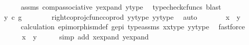 \begin{isabellebody}
\ \ \ \ \ \ \isamarkupfalse%
\ assms\ comp{\isacharunderscore}{\kern0pt}associative{}\ y{\isacharunderscore}{\kern0pt}expand\ y{\isacharunderscore}{\kern0pt}type\ \isamarkupfalse%
\ {\isacharparenleft}{\kern0pt}typecheck{\isacharunderscore}{\kern0pt}cfuncs{\isacharcomma}{\kern0pt}\ blast{\isacharparenright}{\kern0pt}\isanewline
\ \ \ \ \isamarkupfalse%
\ \isamarkupfalse%
\ {\isachardoublequoteopen}{\isachardot}{\kern0pt}{\isachardot}{\kern0pt}{\isachardot}{\kern0pt}\ {\isacharequal}{\kern0pt}\ y{}\ {\isasymcirc}\isactrlsub c\ g{\isachardoublequoteclose}\isanewline
\ \ \ \ \ \ \isamarkupfalse%
\ right{\isacharunderscore}{\kern0pt}coproj{\isacharunderscore}{\kern0pt}cfunc{\isacharunderscore}{\kern0pt}coprod\ y{}{\isacharunderscore}{\kern0pt}y{}{\isacharunderscore}{\kern0pt}type{\isacharparenleft}{\kern0pt}{}{\isacharparenright}{\kern0pt}\ y{}{\isacharunderscore}{\kern0pt}y{}{\isacharunderscore}{\kern0pt}type{\isacharparenleft}{\kern0pt}{}{\isacharparenright}{\kern0pt}\ \isamarkupfalse%
\ auto\isanewline
\ \ \ \ \isamarkupfalse%
\ \isamarkupfalse%
\ {\isachardoublequoteopen}x{}\ {\isacharequal}{\kern0pt}\ y{}{\isachardoublequoteclose}\isanewline
\ \ \ \ \ \ \isamarkupfalse%
\ calculation\ epimorphism{\isacharunderscore}{\kern0pt}def{}\ g{\isacharunderscore}{\kern0pt}epi\ type{\isacharunderscore}{\kern0pt}assms{\isacharparenleft}{\kern0pt}{}{\isacharparenright}{\kern0pt}\ x{}{\isacharunderscore}{\kern0pt}x{}{\isacharunderscore}{\kern0pt}type{\isacharparenleft}{\kern0pt}{}{\isacharparenright}{\kern0pt}\ y{}{\isacharunderscore}{\kern0pt}y{}{\isacharunderscore}{\kern0pt}type{\isacharparenleft}{\kern0pt}{}{\isacharparenright}{\kern0pt}\ \isamarkupfalse%
\ fastforce\isanewline
\ \ \isamarkupfalse%
\isanewline
\ \ \isamarkupfalse%
\ \isamarkupfalse%
\ {\isachardoublequoteopen}x\ {\isacharequal}{\kern0pt}\ y{\isachardoublequoteclose}\isanewline
\ \ \ \ \isamarkupfalse%
\ {\isacharparenleft}{\kern0pt}simp\ add{\isacharcolon}{\kern0pt}\ x{\isacharunderscore}{\kern0pt}expand\ y{\isacharunderscore}{\kern0pt}expand{\isacharparenright}{\kern0pt}\isanewline
{}\isamarkupfalse%
%
\endisatagproof
{\isafoldproof}%
%
\isadelimproof

\end{isabellebody}
